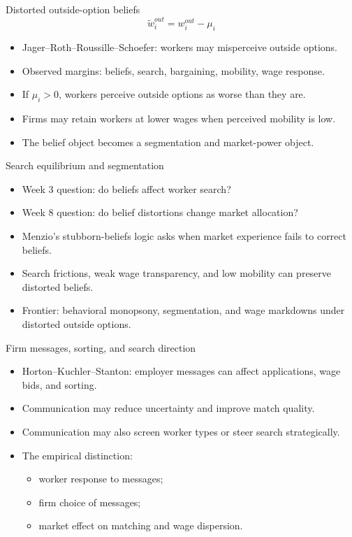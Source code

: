 \documentclass[aspectratio=169,11pt]{beamer}
\begin{document}
\begin{frame}{Distorted outside-option beliefs}
\[
\tilde w_i^{out}=w_i^{out}-\mu_i
\]

\begin{itemize}
    \item Jager--Roth--Roussille--Schoefer: workers may misperceive outside options.
    \item Observed margins: beliefs, search, bargaining, mobility, wage response.
    \item If $\mu_i>0$, workers perceive outside options as worse than they are.
    \item Firms may retain workers at lower wages when perceived mobility is low.
    \item The belief object becomes a segmentation and market-power object.
\end{itemize}
\end{frame}

\begin{frame}{Search equilibrium and segmentation}
\begin{itemize}
    \item Week 3 question: do beliefs affect worker search?
    \item Week 8 question: do belief distortions change market allocation?
    \item Menzio's stubborn-beliefs logic asks when market experience fails to correct beliefs.
    \item Search frictions, weak wage transparency, and low mobility can preserve distorted beliefs.
    \item Frontier: behavioral monopsony, segmentation, and wage markdowns under distorted outside options.
\end{itemize}
\end{frame}

\begin{frame}{Firm messages, sorting, and search direction}
\begin{itemize}
    \item Horton--Kuchler--Stanton: employer messages can affect applications, wage bids, and sorting.
    \item Communication may reduce uncertainty and improve match quality.
    \item Communication may also screen worker types or steer search strategically.
    \item The empirical distinction:
    \begin{itemize}
        \item worker response to messages;
        \item firm choice of messages;
        \item market effect on matching and wage dispersion.
    \end{itemize}
\end{itemize}
\end{frame}
\end{document}
